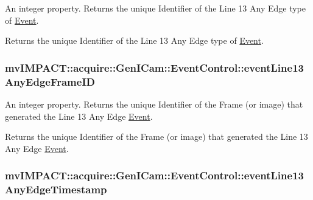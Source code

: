 An integer property. Returns the unique Identifier of the Line 13 Any Edge type of \hyperlink{classmv_i_m_p_a_c_t_1_1acquire_1_1_event}{Event}. 

Returns the unique Identifier of the Line 13 Any Edge type of \hyperlink{classmv_i_m_p_a_c_t_1_1acquire_1_1_event}{Event}. \hypertarget{classmv_i_m_p_a_c_t_1_1acquire_1_1_gen_i_cam_1_1_event_control_a0b9db25af19bc2301161f78e124f90be}{
\subsubsection[{event\+Line13\+Any\+Edge\+Frame\+I\+D}]{ mv\+I\+M\+P\+A\+C\+T\+::acquire\+::\+Gen\+I\+Cam\+::\+Event\+Control\+::event\+Line13\+Any\+Edge\+Frame\+I\+D}}\label{classmv_i_m_p_a_c_t_1_1acquire_1_1_gen_i_cam_1_1_event_control_a0b9db25af19bc2301161f78e124f90be}


An integer property. Returns the unique Identifier of the Frame (or image) that generated the Line 13 Any Edge \hyperlink{classmv_i_m_p_a_c_t_1_1acquire_1_1_event}{Event}. 

Returns the unique Identifier of the Frame (or image) that generated the Line 13 Any Edge \hyperlink{classmv_i_m_p_a_c_t_1_1acquire_1_1_event}{Event}. \hypertarget{classmv_i_m_p_a_c_t_1_1acquire_1_1_gen_i_cam_1_1_event_control_a751a00c428e040180a36563b05870fad}{
\subsubsection[{event\+Line13\+Any\+Edge\+Timestamp}]{ mv\+I\+M\+P\+A\+C\+T\+::acquire\+::\+Gen\+I\+Cam\+::\+Event\+Control\+::event\+Line13\+Any\+Edge\+Timestamp}}\label{classmv_i_m_p_a_c_t_1_1acquire_1_1_gen_i_cam_1_1_event_control_a751a00c428e040180a36563b05870fad}


